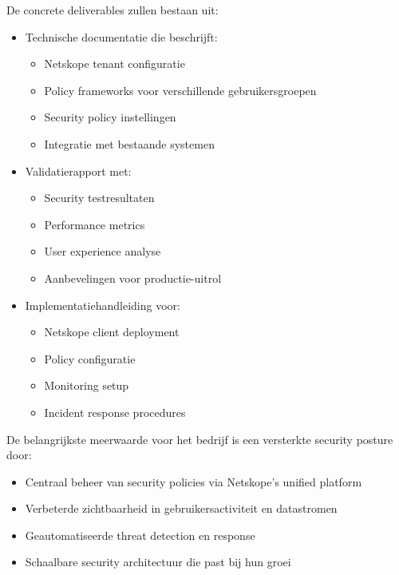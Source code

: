 De concrete deliverables zullen bestaan uit:

\begin{itemize}
  \item Technische documentatie die beschrijft:
  \begin{itemize}
    \item Netskope tenant configuratie
    \item Policy frameworks voor verschillende gebruikersgroepen
    \item Security policy instellingen
    \item Integratie met bestaande systemen
  \end{itemize}

  \item Validatierapport met:
  \begin{itemize}
    \item Security testresultaten
    \item Performance metrics
    \item User experience analyse
    \item Aanbevelingen voor productie-uitrol
  \end{itemize}

  \item Implementatiehandleiding voor:
  \begin{itemize}
    \item Netskope client deployment
    \item Policy configuratie
    \item Monitoring setup
    \item Incident response procedures
  \end{itemize}
\end{itemize}

De belangrijkste meerwaarde voor het bedrijf is een versterkte security posture door:
\begin{itemize}
  \item Centraal beheer van security policies via Netskope's unified platform
  \item Verbeterde zichtbaarheid in gebruikersactiviteit en datastromen
  \item Geautomatiseerde threat detection en response
  \item Schaalbare security architectuur die past bij hun groei
\end{itemize}

